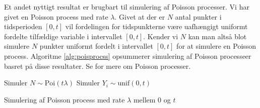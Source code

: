 Et andet nyttigt resultat er brugbart til simulering af Poisson processer. Vi har givet en Poisson process med rate $\lambda$. Givet at der er $N$ antal punkter i tidsperioden $[0,t]$ vil fordelingen for tidspunkterne være uafhængigt uniformt fordelte tilfældige variable i intervallet $[0,t]$. Kender vi $N$ kan man altså blot simulere $N$ punkter uniformt fordelt i intervallet $[0,t]$ for at simulere en Poisson process. Algoritme \ref{alg:poisprocss} opsummerer simulering af Poisson processeer basret på disse resultater. Se \cite[240-247]{olofsson2012} for mere om Poisson processer. 
\begin{algorithm}
\begin{algorithmic}
\STATE Simuler $N \sim \text{Poi}(t\lambda)$ 
\STATE Simuler $Y_i \sim \text{unif}(0,t)$ 
\ENDFOR 
\end{algorithmic}
\caption{Simulering af Poisson process med rate $\lambda$ mellem $0$ og $t$} \label{alg:poisprocss}
\end{algorithm}